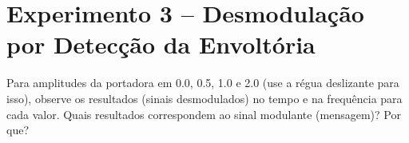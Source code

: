 \documentclass[12pt,addpoints]{exam}
\begin{document}
\section*{Experimento 3 -- Desmodulação por Detecção da Envoltória}

\begin{questions}
    \question Para amplitudes da portadora em 0.0, 0.5, 1.0 e 2.0 (use  a régua deslizante para isso), observe os resultados (sinais desmodulados) no tempo e na frequência para cada valor. Quais resultados correspondem ao sinal modulante (mensagem)? Por que?
    \fillwithlines{0.75in}
\end{questions}

%
%    
%
%
\end{document}
